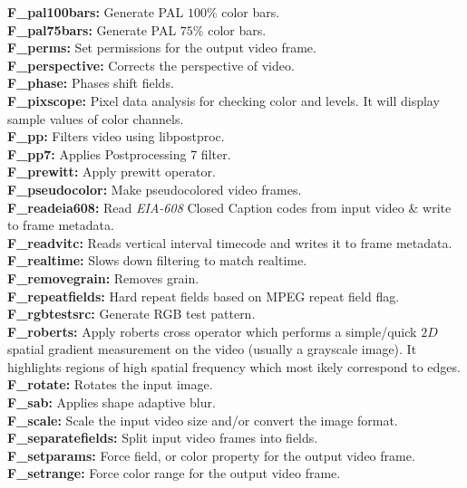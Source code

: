 \textbf{F\_pal100bars:} Generate PAL $100\%$ color bars.\\
\textbf{F\_pal75bars:} Generate PAL $75\%$ color bars.\\
\textbf{F\_perms:} Set permissions for the output video frame.\\
\textbf{F\_perspective:} Corrects the perspective of video.\\
\textbf{F\_phase:} Phases shift fields.\\
\textbf{F\_pixscope:} Pixel data analysis for checking color and levels. It will display sample values of color channels.\\
\textbf{F\_pp:} Filters video using libpostproc.\\
\textbf{F\_pp7:} Applies Postprocessing 7 filter.\\
\textbf{F\_prewitt:} Apply prewitt operator.\\
\textbf{F\_pseudocolor:} Make pseudocolored video frames.\\
\textbf{F\_readeia608:} Read \textit{EIA-608} Closed Caption codes from input video \& write to frame metadata.\\
\textbf{F\_readvitc:} Reads vertical interval timecode and writes it to frame metadata.\\
\textbf{F\_realtime:} Slows down filtering to match realtime.\\
\textbf{F\_removegrain:} Removes grain.\\
\textbf{F\_repeatfields:} Hard repeat fields based on MPEG repeat field flag.\\
\textbf{F\_rgbtestsrc:} Generate RGB test pattern.\\
\textbf{F\_roberts:} Apply roberts cross operator which performs a simple/quick $2D$ spatial gradient measurement on the video (usually a grayscale image). It highlights regions of high spatial
frequency which most ikely correspond to edges.\\
\textbf{F\_rotate:} Rotates the input image.\\
\textbf{F\_sab:} Applies shape adaptive blur.\\
\textbf{F\_scale:} Scale the input video size and/or convert the image format.\\
\textbf{F\_separatefields:} Split input video frames into fields.\\
\textbf{F\_setparams:} Force field, or color property for the output video frame.\\
\textbf{F\_setrange:} Force color range for the output video frame.\\
